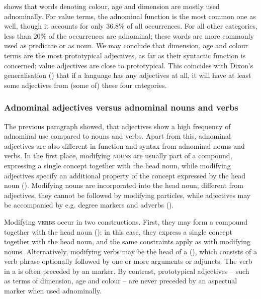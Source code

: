  shows that words denoting colour, age and dimension are mostly used adnominally. For value terms, the adnominal function is the most common one as well, though it accounts for only 36.8\% of all occurrences. For all other categories, less than 20\% of the occurrences are adnominal; these words are more commonly used as predicate or as noun. We may conclude that dimension, age and colour terms are the most prototypical adjectives, as far as their syntactic function is concerned; value adjectives are close to prototypical. This coincides with Dixon’s generalisation (\citealt[73]{Dixon2012}) that if a language has any adjectives at all, it will have at least some adjectives from (some of) these four categories.

\subsubsection[Adnominal adjectives versus adnominal nouns and verbs]{Adnominal adjectives versus adnominal nouns and verbs}\label{sec:3.5.1.4}
 
The previous paragraph showed, that adjectives show a high frequency of adnominal use compared to nouns and verbs. Apart from this, adnominal adjectives are also different in function and syntax from adnominal nouns and verbs. In the first place, modifying \textsc{nouns} are usually part of a compound, expressing a single concept together with the head noun, while modifying adjectives specify an additional property of the concept expressed by the head noun (). Modifying nouns are incorporated into the head noun; different from adjectives, they cannot be followed by modifying particles, while adjectives may be accompanied by e.g. degree markers and adverbs ().

Modifying \textsc{verbs} occur in two constructions. First, they may form a compound together with the head noun (); in this case, they express a single concept together with the head noun, and the same constraints apply as with modifying nouns. Alternatively, modifying verbs may be the head of a  (), which consists of a verb phrase optionally followed by one or more arguments or adjuncts. The verb in a  is often preceded by an  marker. By contrast, prototypical adjectives – such as terms of dimension, age and colour – are never preceded by an aspectual marker when used adnominally. 

